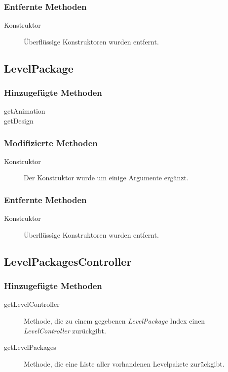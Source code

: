 	\subsubsection{Entfernte Methoden}
		\begin{description}
			\item[Konstruktor] Überflüssige Konstruktoren wurden entfernt.
		\end{description}


\subsection{LevelPackage}

	\subsubsection{Hinzugefügte Methoden}
		\begin{description}
			\item[getAnimation]
			\item[getDesign]
		\end{description}
	\subsubsection{Modifizierte Methoden}
		\begin{description}
			\item[Konstruktor] Der Konstruktor wurde um einige Argumente ergänzt.
		\end{description}
	\subsubsection{Entfernte Methoden}
		\begin{description}
			\item[Konstruktor] Überflüssige Konstruktoren wurden entfernt.
		\end{description}



\subsection{LevelPackagesController}

	\subsubsection{Hinzugefügte Methoden}
		\begin{description}
			\item[getLevelController] Methode, die zu einem gegebenen \emph{LevelPackage} Index einen
			 \emph{LevelController} zurückgibt. 
			\item[getLevelPackages] Methode, die eine Liste aller vorhandenen Levelpakete zurückgibt.
		\end{description}


